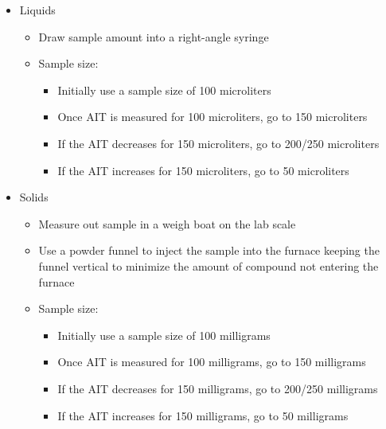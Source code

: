 \documentclass[letterpaper,11pt]{article}
\begin{document}
    \begin{itemize}
    \item Liquids
        \begin{itemize}
        \item Draw sample amount into a right-angle syringe
        \item Sample size:
            \begin{itemize}
            \item Initially use a sample size of 100 microliters
            \item Once AIT is measured for 100 microliters, go to 150 
                microliters
            \item If the AIT decreases for 150 microliters, go to 200/250 
                microliters
            \item If the AIT increases for 150 microliters, go to 50 
                microliters
            \end{itemize}
        
        \end{itemize}
            

    \item Solids
        \begin{itemize}
        \item Measure out sample in a weigh boat on the lab scale
        \item Use a powder funnel to inject the sample into the furnace keeping
            the funnel vertical to minimize the amount of compound not entering 
            the furnace
        \item Sample size:
            \begin{itemize}
            \item Initially use a sample size of 100 milligrams
            \item Once AIT is measured for 100 milligrams, go to 150 
                milligrams
            \item If the AIT decreases for 150 milligrams, go to 200/250 
                milligrams
            \item If the AIT increases for 150 milligrams, go to 50 
                milligrams
            \end{itemize}
        
        \end{itemize}
        

\end{itemize}
\end{document}

